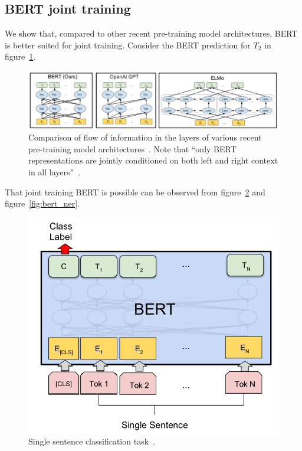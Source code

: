 \subsection{BERT joint training}
\label{subsec:bert_joint_training}
We show that, compared to other recent pre-training model architectures, BERT is better suited for joint training.
Consider the BERT prediction for $T_2$ in figure~\ref{fig:bert_comparison}.

\begin{figure}[htbp]
    \begin{center}
        \includegraphics[scale=1]{figures/deeply_bidirectional.png}
    \end{center}
    \caption{
        Comparison of flow of information in the layers of various recent pre-training model architectures~\cite[Figure 1]{devlin2018}.
        Note that ``only BERT representations are jointly conditioned on both left and right context in all layers''~\citet{devlin2018}.
    }
    \label{fig:bert_comparison}
\end{figure}

That joint training BERT is possible can be observed from figure~\ref{fig:bert_single_sentence} and figure~\ref{fig:bert_ner}.
\begin{figure}[htbp]
    \begin{center}
        \includegraphics[scale=0.3]{figures/bert_single_sentence.png}
    \end{center}
    \caption{Single sentence classification task~\cite[Figure 3]{devlin2018}.}
    \label{fig:bert_single_sentence}
\end{figure}

